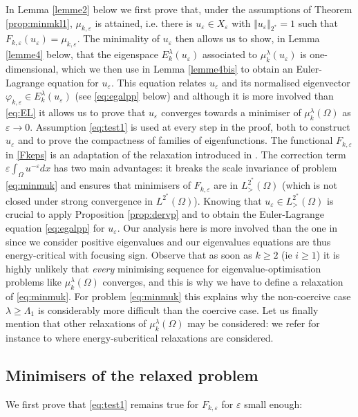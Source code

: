 \documentclass[10pt]{amsart}
\numberwithin{equation}{section}
\newcommand{\ve}{\varepsilon}
\newcommand{\vp}{\varphi}
\newcommand{\Om}{\Omega}
\newcommand{\mkl}{\mu_{k}^{\lambda}}
\newcommand{\mkle}{\mu_{k,\ve}}
\newcommand{\Fke}{F_{k,\ve}}
\theoremstyle{plain}
\theoremstyle{remark}
\begin{document}
In Lemma \ref{lemme2} below we first prove that, under the assumptions of Theorem  \ref{prop:minmkl1}, $\mkle$ is attained, i.e. there is $u_\ve \in X_\ve$ with $\Vert u_\ve\Vert_{2^*} = 1$ such that $F_{k,\ve}(u_\ve) = \mkle$. The minimality of $u_\ve$ then allows us to show, in Lemma \ref{lemme4} below, that the eigenspace $E_k^{\lambda}(u_\ve)$ associated to $\mkl(u_\ve)$ is one-dimensional, which we then use in Lemma \ref{lemme4bis} to obtain an Euler-Lagrange equation for $u_\ve$. This equation relates $u_\ve$ and its normalised eigenvector  $\vp_{k,\ve}\in E_k^{\lambda}(u_\ve)$ (see \eqref{eq:egalpp} below) and although it is more involved than \eqref{eq:EL} it allows us to prove that $u_\ve$ converges towards a minimiser of $\mkl(\Om)$ as $\ve \to 0$. Assumption \eqref{eq:test1} is used at every step in the proof, both to construct $u_\ve$ and to prove the compactness of families of eigenfunctions. The functional $\Fke$ in \eqref{Fkeps} is an adaptation of the relaxation introduced in \cite{GurskyPerez}. The correction term $\ve \int_{\Om} u^{-\ve}dx$ has two main advantages: it breaks the scale invariance of problem \eqref{eq:minmuk} and ensures that minimisers of $F_{k,\ve}$ are in $L^{2^*}_{>}(\Om)$ (which is not closed under strong convergence in $L^{2^*}(\Om)$). Knowing that $u_\ve \in L^{2^*}_{>}(\Om)$ is crucial to apply Proposition \ref{prop:dervp} and to obtain the Euler-Lagrange equation \eqref{eq:egalpp} for $u_\ve$. Our analysis here is more involved than the one in  \cite{GurskyPerez} since we consider positive eigenvalues and our eigenvalues equations are thus energy-critical with focusing sign. Observe that as soon as $k \ge 2$ (ie $i \ge 1$) it is highly unlikely that \emph{every} minimising sequence for eigenvalue-optimisation problems like $\mkl(\Omega)$ converges, and this is why we have to define a relaxation of \eqref{eq:minmuk}. For problem \eqref{eq:minmuk} this explains why the non-coercive case $\lambda \ge \Lambda_1$ is considerably more difficult than the coercive case. Let us finally mention that other relaxations of $\mkl(\Om)$ may be considered: we refer for instance to \cite{HumbertPetridesPremoselli} where energy-subcritical relaxations are considered. 



\subsection{Minimisers of the relaxed problem} \label{minrelaxed}


We first prove that \eqref{eq:test1} remains true for $\Fke$ for $\ve$ small enough:
\end{document}
